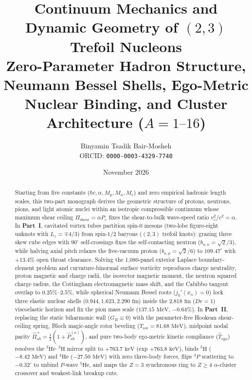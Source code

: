\documentclass[11pt, a4paper]{article}
\title{\vspace{-0.7cm}\textbf{Continuum Mechanics and Dynamic Geometry of $(2,3)$ Trefoil Nucleons}\\[0.28em]
\large Zero-Parameter Hadron Structure, Neumann Bessel Shells, Ego-Metric Nuclear Binding, and Cluster Architecture ($A = 1\text{--}16$)}
\author{Binyamin Tsadik Bair-Mosheh\\[0.15em]
\small ORCID: \texttt{0000-0003-4329-7740}}
\date{November 2026}
\begin{document}
\maketitle
\vspace{-0.45cm}

\begin{abstract}
\noindent Starting from five constants ($\hbar c, \alpha, M_p, M_n, M_e$) and zero empirical hadronic length scales, this two-part monograph derives the geometric structure of protons, neutrons, pions, and light atomic nuclei within an isotropic compressible continuum whose maximum shear ceiling $\Pi_{\mathrm{shear}} = \alpha P_c$ fixes the shear-to-bulk wave-speed ratio $v_s^2/c^2 = \alpha$. In \textbf{Part~I}, cavitated vortex tubes partition spin-$0$ mesons (two-lobe figure-eight unknots with $L_z = \mp 4/3$) from spin-$1/2$ baryons ($(2,3)$ trefoil knots): grazing three skew cube edges with $90^\circ$ self-crossings fixes the self-contacting neutron ($b_{u,n} = \sqrt{2}/3$), while halving axial pitch relaxes the free-vacuum proton ($b_{u,p} = \sqrt{2}/6$) to $109.47^\circ$ with $+13.4\%$ open throat clearance. Solving the 1,080-panel exterior Laplace boundary-element problem and curvature-binormal surface vorticity reproduces charge neutrality, proton magnetic and charge radii, the isovector magnetic moment, the neutron squared charge radius, the Cottingham electromagnetic mass shift, and the Cabibbo tangent overlap to $0.25\%\text{--}2.5\%$, while spherical Neumann Bessel roots ($j_0'(x_n) = 0$) lock three elastic nuclear shells ($0.944, 1.623, 2.290\text{ fm}$) inside the $2.818\text{ fm}$ ($De = 1$) viscoelastic horizon and fix the pion mass scale ($137.15\text{ MeV}$, $-0.64\%$). In \textbf{Part~II}, replacing the static biharmonic wall ($G_B \equiv 0$) with the parameter-free Hookean shear-ceiling spring, Bloch magic-angle rotor beveling ($T_{\mathrm{rot}} = 81.68\text{ MeV}$), midpoint nodal parity $\hat{\Pi}_{ab}^+ = \frac{1}{2}(1 + \hat{P}_{ab}^{(x)})$, and pure two-body ego-metric kinetic compliance ($\hat{T}_{\mathrm{ego}}$) resolves the $^3\text{He}\text{--}{}^3\text{H}$ mirror split to $+763.7\text{ keV}$ (exp $+763.8\text{ keV}$), binds $^3\text{H}$ ($-8.42\text{ MeV}$) and $^4\text{He}$ ($-27.50\text{ MeV}$) with zero three-body forces, flips $^3P$ scattering to $-0.32^\circ$ to unbind $P$-wave $^5\text{He}$, and maps the $Z = 3$ synchronous ring to $Z \ge 4$ $\alpha$-cluster crossover and weakest-link breakup cuts.
\end{abstract}
\end{document}
